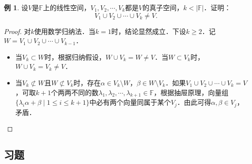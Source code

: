 \documentclass[a4paper,fontset=windows]{ctexbook}
\theoremstyle{definition}
\newtheorem{example}{例}[chapter]
\renewcommand{\le}{\leqslant}
\renewcommand{\ge}{\geqslant}
\begin{document}
\begin{example}
设$V$是$\mathbb{F}$上的线性空间，$V_1,V_2,\cdots,V_k$都是$V$的真子空间，$k<|\mathbb{F}|$．证明：
$$V_1\cup V_2\cup\cdots\cup V_k\ne V.$$
\end{example}

\begin{proof}
对$k$使用数学归纳法．当$k=1$时，结论显然成立．下设$k\ge 2$．记$W=V_1\cup V_2\cup\cdots\cup V_{k-1}$．

\begin{itemize}
\item 当$V_k\subset W$时，根据归纳假设，$W\cup V_k=W\ne V$．当$W\subset V_k$时，$W\cup V_k=V_k\ne V$．

\item 当$V_k\not\subset W$且$W\not\subset V_k$时，存在$\alpha\in V_k\setminus W$，$\beta\in W\setminus V_k$．如果$V_1\cup V_2\cup\cdots\cup V_k=V$，可取$k+1$个两两不同的数$\lambda_1,\lambda_2,\cdots,\lambda_{k+1}\in\mathbb{F}$，根据抽屉原理，向量组$\{\lambda_i\alpha+\beta\mid 1\le i\le k+1\}$中必有两个向量同属于某个$V_j$．由此可得$\alpha,\beta\in V_j$，矛盾．\qedhere
\end{itemize}
\end{proof}

\subsection*{习题}
\end{document}
